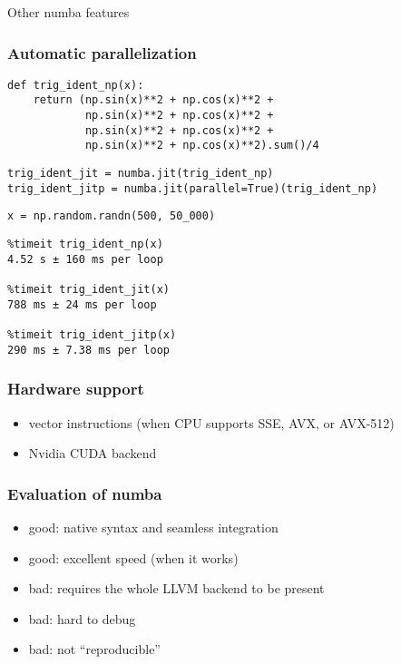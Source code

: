 \documentclass[serif]{beamer}
\begin{document}
\begin{frame}[c]
  \Huge{Other numba features}
\end{frame}

\begin{frame}[fragile]
  \frametitle{Automatic parallelization}

  \begin{verbatim}
def trig_ident_np(x):
    return (np.sin(x)**2 + np.cos(x)**2 +
            np.sin(x)**2 + np.cos(x)**2 +
            np.sin(x)**2 + np.cos(x)**2 +
            np.sin(x)**2 + np.cos(x)**2).sum()/4
  \end{verbatim}
  \pause
  \begin{verbatim}
trig_ident_jit = numba.jit(trig_ident_np)
trig_ident_jitp = numba.jit(parallel=True)(trig_ident_np)
  \end{verbatim}
  \medskip
  \pause
  \begin{verbatim}
x = np.random.randn(500, 50_000)
  \end{verbatim}
  \begin{verbatim}
%timeit trig_ident_np(x)
4.52 s ± 160 ms per loop

%timeit trig_ident_jit(x)
788 ms ± 24 ms per loop

%timeit trig_ident_jitp(x)
290 ms ± 7.38 ms per loop
  \end{verbatim}
\end{frame}

\begin{frame}
  \frametitle{Hardware support}

  \begin{itemize}
  \item vector instructions (when CPU supports SSE, AVX, or AVX-512)
  \item Nvidia CUDA backend
  \end{itemize}
\end{frame}

\begin{frame}
  \frametitle{Evaluation of numba}

 \begin{itemize}
 \item good: native syntax and seamless integration
 \item good: excellent speed (when it works)
 \item bad: requires the whole LLVM backend to be present
 \item bad: hard to debug
 \item bad: not ``reproducible''
 \end{itemize}
\end{frame}
\end{document}
